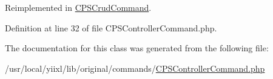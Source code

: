 Reimplemented in \hyperlink{classCPSCrudCommand_af71005841ce53adac00581ab0ba24c1f}{CPSCrudCommand}.



Definition at line 32 of file CPSControllerCommand.php.



The documentation for this class was generated from the following file:\begin{DoxyCompactItemize}
\item 
/usr/local/yiixl/lib/original/commands/\hyperlink{CPSControllerCommand_8php}{CPSControllerCommand.php}\end{DoxyCompactItemize}
